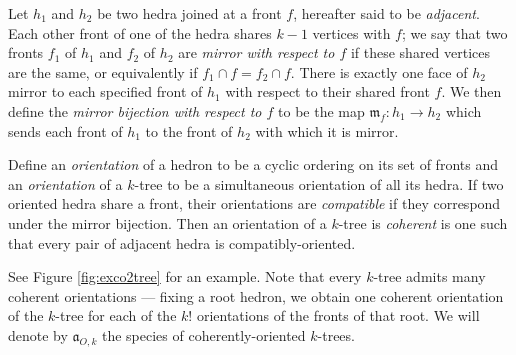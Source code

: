 \documentclass[sectionflow,singlespace,twoside]{brandiss} %
\numberwithin{section}{chapter}
\numberwithin{figure}{chapter}
\begin{document}
\begin{definition}
  \label{def:mirrorfronts}
  Let $h_{1}$ and $h_{2}$ be two hedra joined at a front $f$, hereafter said to be \emph{adjacent}.
  Each other front of one of the hedra shares $k-1$ vertices with $f$; we say that two fronts $f_{1}$ of $h_{1}$ and $f_{2}$ of $h_{2}$ are \emph{mirror with respect to $f$} if these shared vertices are the same, or equivalently if $f_{1} \cap f = f_{2} \cap f$.
  There is exactly one face of $h_{2}$ mirror to each specified front of $h_{1}$ with respect to their shared front $f$.
  We then define the \emph{mirror bijection with respect to $f$} to be the map $\mathfrak{m}_{f}: h_{1} \to h_{2}$ which sends each front of $h_{1}$ to the front of $h_{2}$ with which it is mirror.
\end{definition}

\begin{comment} Don't think we need this after all...
  \begin{definition}\label{def:cycord}
    For a set $A$, define a \emph{cyclic order of $A$} to be a labeling of the cyclic digraph $\overrightarrow{C}_{\abs{A}}$ by $A$ and let $\cyc A$ be the set of such linear orders. Let $\lin A$ be the set of linear orders on $A$. Let $\psi_{A}: \lin A \to \cyc A$ (hereafter denoted simply $\psi$ when the set is unambiguous) send each linear order $\ell$ to the cyclic order obtained by decorating $\overrightarrow{C}_{\abs{A}}$ with $\ell$ in order. (Note that this map is $\abs{A}$-to-one.) Then a \emph{linearization} of a given cyclic order $c \in \cyc A$ is an element of $\psi^{-1} \pbrac{c}$.
  \end{definition}
\end{comment}

\begin{definition}
  \label{def:coktree}
  Define an \emph{orientation} of a hedron to be a cyclic ordering on its set of fronts and an \emph{orientation} of a $k$-tree to be a simultaneous orientation of all its hedra.
  If two oriented hedra share a front, their orientations are \emph{compatible} if they correspond under the mirror bijection.
  Then an orientation of a $k$-tree is \emph{coherent} is one such that every pair of adjacent hedra is compatibly-oriented.
\end{definition}
See Figure \ref{fig:exco2tree} for an example.
Note that every $k$-tree admits many coherent orientations --- fixing a root hedron, we obtain one coherent orientation of the $k$-tree for each of the $k!$ orientations of the fronts of that root.
We will denote by $\mathfrak{a}_{O, k}$ the species of coherently-oriented $k$-trees.
\end{document}
